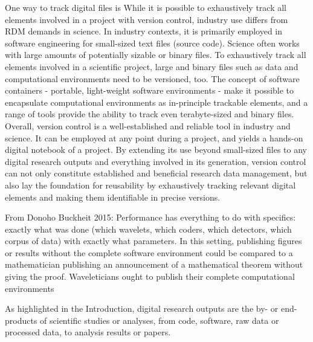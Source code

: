 \pagebreak


One way to track digital files is
While it is possible to exhaustively track all elements involved in a project with version control, industry use differs from RDM demands in science.
In industry contexts, it is primarily employed in software engineering for small-sized text files (source code). Science often works with large amounts of potentially sizable or binary files.
To exhaustively track all elements involved in a scientific project, large and binary files such as data and computational environments need to be versioned, too.
The concept of software containers - portable, light-weight software environments - make it possible to encapsulate computational environments as in-principle trackable elements, and a range of tools provide the ability to track even terabyte-sized and binary files.
Overall, version control is a well-established and reliable tool in industry and science. It can be employed at any point during a project, and yields a hands-on digital notebook of a project.
By extending its use beyond small-sized files to any digital research outputs and everything involved in its generation, version control can not only constitute established and beneficial research data management, but also lay the foundation for reusability by exhaustively tracking relevant digital elements and making them identifiable in precise versions.

From Donoho Buckheit 2015: Performance has everything to do with specifics: exactly what was done (which wavelets,
which coders, which detectors, which corpus of data) with exactly what parameters. In
this setting, publishing figures or results without the complete software environment could
be compared to a mathematician publishing an announcement of a mathematical theorem
without giving the proof. Waveleticians ought to publish their complete computational
environments


As highlighted in the Introduction, digital research outputs are the by- or end-products of scientific studies or analyses, from code, software, raw data or processed data, to analysis results or papers.
